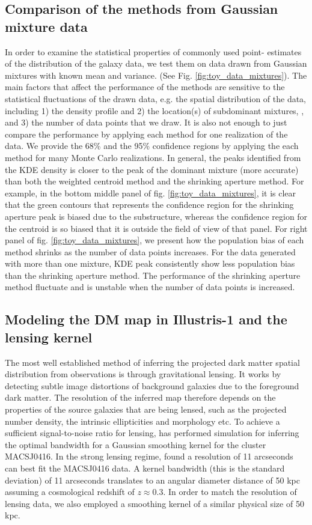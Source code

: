 \subsection{Comparison of the methods from Gaussian mixture data}
In order to examine the statistical properties of commonly used point-
estimates of the distribution of the galaxy data, we test them on data drawn 
from Gaussian mixtures with known mean and variance. (See Fig.
\ref{fig:toy_data_mixtures}). The main factors that affect the performance of 
the methods are sensitive to the statistical fluctuations of the drawn data, 
e.g. the
spatial distribution of the data, including 1) the density profile and 2) the
location(s) of subdominant mixtures,
, and 3) the number of data points that we draw.
It is also not enough to just
compare the performance by applying each method for one realization of the
data. We provide the 68\% and the 95\% confidence regions by applying the
each method for many Monte Carlo realizations.
In general, the peaks identified from the KDE density is closer to the 
peak of the dominant mixture (more accurate) than 
both the weighted centroid method and the shrinking aperture method.
For example, in the bottom middle panel of fig. \ref{fig:toy_data_mixtures}, 
it is clear that the green contours
that represents the confidence region for the shrinking aperture peak is
biased due to the substructure, whereas the confidence region for the centroid 
is so biased that it is outside the field of view of that panel.
For right panel of fig. \ref{fig:toy_data_mixtures}, 
we present how the population bias of each method shrinks as the
number of data points increases. For the data generated with more than one mixture, 
KDE peak consistently show less population bias than the shrinking aperture method. 
The performance of the shrinking aperture method fluctuate and is unstable when
the number of data points is increased.

\subsection{Modeling the DM map in Illustris-1 and the lensing kernel}
The most well established method of inferring the projected dark matter spatial 
distribution from observations is through gravitational lensing.
It works by detecting subtle image distortions of background galaxies due to
the foreground dark matter. The resolution of the inferred map therefore 
depends on the properties of the source galaxies that are being lensed, 
such as the projected number density, the intrinsic ellipticities and morphology etc.
To achieve a sufficient signal-to-noise ratio for lensing, 
\cite{Hoag2016} has performed simulation for inferring the optimal bandwidth
for a Gaussian smoothing kernel for the cluster MACSJ0416. 
In the strong lensing regime, \cite{Hoag2016} found a resolution of 11 arcseconds
can best fit the MACSJ0416 data. A kernel bandwidth (this is the standard deviation) 
of 11 arcseconds translates to an angular diameter distance of 50 
kpc assuming a cosmological redshift of $z \approx 0.3$. 
In order to match the resolution of lensing data,
we also employed a smoothing kernel of a similar physical size of 50 kpc.  

